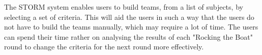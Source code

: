 The STORM system enables users to build teams, from a list of subjects, by selecting a set of criteria. This will aid the users in such a way that the users do not have to build the teams manually, which may require a lot of time. The users can spend their time rather on analysing the results of each "Rocking the Boat" round to change the criteria for the next round more effectively.